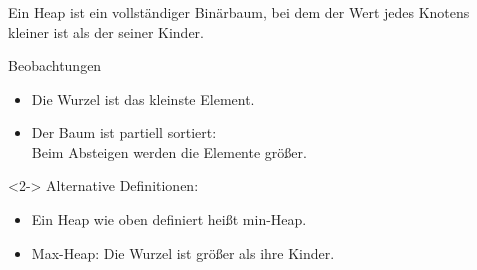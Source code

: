 \begin{frame}
\frametitle{\insertsection}

\begin{definition}[Heap]
	Ein \alert{Heap} ist ein vollständiger Binärbaum, 
	bei dem der Wert jedes Knotens kleiner ist als der seiner Kinder.
\end{definition}
\begin{block}
{Beobachtungen}
\begin{itemize}
	\item Die Wurzel ist das kleinste Element.
	\item Der Baum ist \alert{partiell sortiert}:\\
		Beim Absteigen werden die Elemente größer.
\end{itemize}
\end{block}
\begin{block}<2->
{Alternative Definitionen:}
\begin{itemize}
	\item Ein Heap wie oben definiert heißt \alert{min-Heap}.
	\item \alert{Max-Heap}: Die Wurzel ist \alert{größer} als ihre Kinder.
\end{itemize}
\end{block}
\end{frame}


\endinput

\begin{frame}
\frametitle{\insertsection}
\begin{block}
{}
\end{block}
\end{frame}
